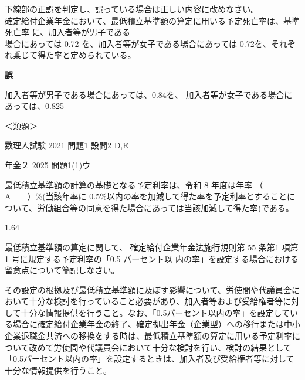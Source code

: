 \begin{truefalse}[年金2 2023 問題1(1)イ]
  下線部の正誤を判定し、誤っている場合は正しい内容に改めなさい。
\\

  確定給付企業年金において、最低積立基準額の算定に用いる予定死亡率は、基準死亡率
に、\underline{加入者等が男子である}\\
\underline{場合にあっては 0.72 を、加入者等が女子である場合にあっては
0.72}を、それぞれ乗じて得た率と定められている。
\end{truefalse}

\begin{answerbox}
  \textbf{誤}

  加入者等が男子である場合にあっては、0.84を、
  加入者等が女子である場合にあっては、0.825
\end{answerbox}

\begin{explanationbox}
  ＜類題＞

  数理人試験 2021 問題1 設問2 D,E

  年金２ 2025 問題1(1)ウ
\end{explanationbox}

\begin{fillblank}[自作 2026/11/10]
  最低積立基準額の計算の基礎となる予定利率は、令和 8 年度は年率 （　　A　　）\%(当該年率に 0.5\%以内の率を加減して得た率を予定利率とすることについて、労働組合等の同意を得た場合にあっては当該加減して得た率)である。
\end{fillblank}

\begin{answerbox}
  1.64
\end{answerbox}

\begin{shortanswer}[年金2 2019 問題2(1)\textcircled{2}]
  最低積立基準額の算定に関して、
  確定給付企業年金法施行規則第 55 条第1 項第1 号に規定する予定利率の「0.5 パーセント以
内の率」を設定する場合における留意点について簡記しなさい。
\end{shortanswer}

\begin{answerbox}
  その設定の根拠及び最低積立基準額に及ぼす影響について、労使間や代議員会において十分な検討を行っていること必要があり、加入者等および受給権者等に対して十分な情報提供を行うこと。なお、「0.5パーセント以内の率」を設定している場合に確定給付企業年金の終了、確定拠出年金（企業型）への移行または中小企業退職金共済への移換をする時は、最低積立基準額の算定に用いる予定利率について改めて労使間や代議員会において十分な検討を行い、検討の結果として「0.5パーセント以内の率」を設定するときは、加入者及び受給権者等に対して十分な情報提供を行うこと。
\end{answerbox}

